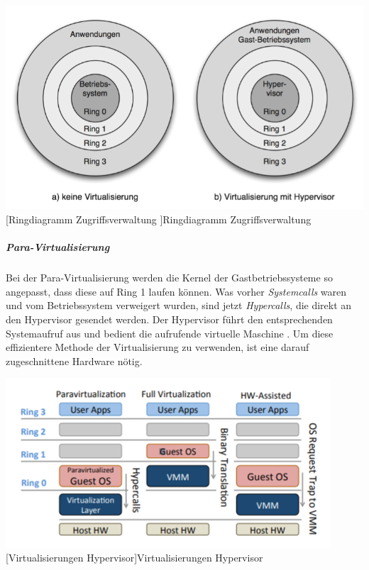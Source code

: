  \vspace{1em}
\begin{minipage}{\linewidth}
	\centering
	\includegraphics[width=1\linewidth]{pics/Ringmodell1.PNG}
	[Ringdiagramm Zugriffsverwaltung ]{Ringdiagramm Zugriffsverwaltung \cite{Meinel2011VirtualisierungMarktubersicht} }
	\label{fig:Ringmodell1}
\end{minipage}
 
 \subparagraph{Para-Virtualisierung}
 Bei der Para-Virtualisierung werden die Kernel der Gastbetriebssysteme so angepasst, dass diese auf Ring 1 laufen können. Was vorher \emph{Systemcalls} waren und vom Betriebssystem verweigert wurden, sind jetzt \emph{Hypercalls}, die direkt an den Hypervisor gesendet werden. Der Hypervisor führt den entsprechenden Systemaufruf aus und bedient die aufrufende virtuelle Maschine \cite{Meinel2011VirtualisierungMarktubersicht}. Um diese effizientere Methode der Virtualisierung zu verwenden, ist eine darauf zugeschnittene Hardware nötig.

\vspace{1em}
\begin{minipage}{\linewidth}
	\centering
	\includegraphics[width=0.8\linewidth]{pics/Virtualisierungen_Hypervisor.PNG}
	[Virtualisierungen Hypervisor]{Virtualisierungen Hypervisor \cite{Fayyad-Kazan2013BenchmarkingHypervisors}}
	\label{fig:Virtualisierungen_Hypervisor}
\end{minipage}
 

